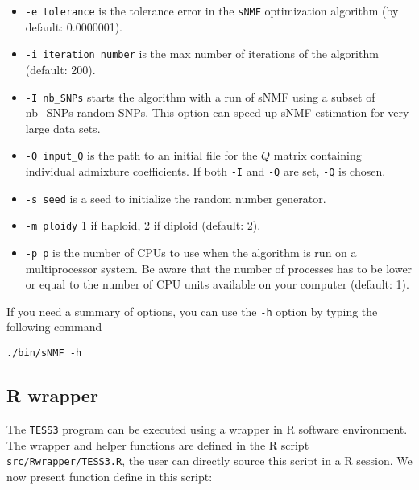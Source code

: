 \documentclass[10pt,a4paper]{article}
\begin{document}
\begin{itemize}
\item \verb|-e tolerance| is the tolerance error in the {\tt sNMF} optimization algorithm (by default: 0.0000001). 
\item \verb|-i iteration_number| is the max number of iterations of the algorithm (default: 200). 
\item \verb|-I nb_SNPs| starts the algorithm with a run of sNMF using a subset of nb\_SNPs random SNPs. This option can speed up sNMF estimation for very large data sets.
\item \verb|-Q input_Q| is the path to an initial file for the $Q$ matrix containing individual admixture coefficients. If both \verb|-I| and \verb|-Q| are set, \verb|-Q| is chosen.
\item \verb|-s seed| is a seed to initialize the random number generator. 
\item \verb|-m ploidy|  1 if haploid, 2 if diploid (default: 2). 
\item \verb|-p p| is the number of CPUs to use when the algorithm is run on a multiprocessor system.
Be aware that the number of processes has to be lower or equal to the number 
of CPU units available on your computer (default: 1).

\end{itemize}


\noindent
If you need a summary of options, you can use the \verb|-h| option by typing the following command
\footnotesize
\begin{Verbatim}[frame=single]
./bin/sNMF -h
\end{Verbatim}
\noindent
\normalsize

\subsection{R wrapper}
The {\tt TESS3} program can be executed using a wrapper in R software environment. The wrapper and helper functions are defined in the R script \verb|src/Rwrapper/TESS3.R|, the user can directly source this script in a R session. We now present function define in this script: 
\end{document}
